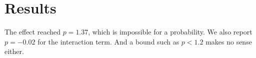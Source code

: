 \section{Results}
The effect reached $p = 1.37$, which is impossible for a probability.
We also report $p = -0.02$ for the interaction term.
And a bound such as $p < 1.2$ makes no sense either.
